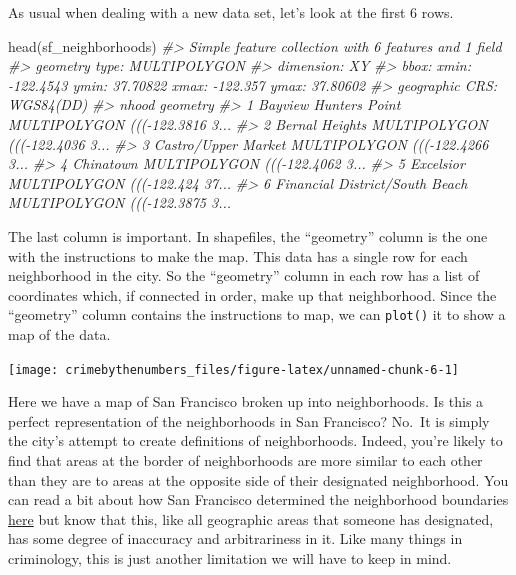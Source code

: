 \documentclass[
  12pt,
]{book}
\newenvironment{Shaded}{\begin{snugshade}}{\end{snugshade}}
\newcommand{\CommentTok}[1]{\textcolor[rgb]{0.37,0.37,0.37}{\textit{#1}}}
\newcommand{\FunctionTok}[1]{\textcolor[rgb]{0,0,0}{#1}}
\newcommand{\NormalTok}[1]{#1}
\newcommand{\SpecialCharTok}[1]{\textcolor[rgb]{0,0,0}{#1}}
\begin{document}
As usual when dealing with a new data set, let's look at the first 6 rows.

\begin{Shaded}
\begin{Highlighting}[]
\FunctionTok{head}\NormalTok{(sf\_neighborhoods)}
\CommentTok{\#\textgreater{} Simple feature collection with 6 features and 1 field}
\CommentTok{\#\textgreater{} geometry type:  MULTIPOLYGON}
\CommentTok{\#\textgreater{} dimension:      XY}
\CommentTok{\#\textgreater{} bbox:           xmin: {-}122.4543 ymin: 37.70822 xmax: {-}122.357 ymax: 37.80602}
\CommentTok{\#\textgreater{} geographic CRS: WGS84(DD)}
\CommentTok{\#\textgreater{}                            nhood                       geometry}
\CommentTok{\#\textgreater{} 1          Bayview Hunters Point MULTIPOLYGON ((({-}122.3816 3...}
\CommentTok{\#\textgreater{} 2                 Bernal Heights MULTIPOLYGON ((({-}122.4036 3...}
\CommentTok{\#\textgreater{} 3            Castro/Upper Market MULTIPOLYGON ((({-}122.4266 3...}
\CommentTok{\#\textgreater{} 4                      Chinatown MULTIPOLYGON ((({-}122.4062 3...}
\CommentTok{\#\textgreater{} 5                      Excelsior MULTIPOLYGON ((({-}122.424 37...}
\CommentTok{\#\textgreater{} 6 Financial District/South Beach MULTIPOLYGON ((({-}122.3875 3...}
\end{Highlighting}
\end{Shaded}

The last column is important. In shapefiles, the ``geometry'' column is the one with the instructions to make the map. This data has a single row for each neighborhood in the city. So the ``geometry'' column in each row has a list of coordinates which, if connected in order, make up that neighborhood. Since the ``geometry'' column contains the instructions to map, we can \texttt{plot()} it to show a map of the data.

\begin{Shaded}
\end{Shaded}

\begin{center}\texttt{[image: crimebythenumbers\_files/figure-latex/unnamed-chunk-6-1]} \end{center}

Here we have a map of San Francisco broken up into neighborhoods. Is this a perfect representation of the neighborhoods in San Francisco? No.~It is simply the city's attempt to create definitions of neighborhoods. Indeed, you're likely to find that areas at the border of neighborhoods are more similar to each other than they are to areas at the opposite side of their designated neighborhood. You can read a bit about how San Francisco determined the neighborhood boundaries \href{https://data.sfgov.org/Geographic-Locations-and-Boundaries/Analysis-Neighborhoods/p5b7-5n3h}{here} but know that this, like all geographic areas that someone has designated, has some degree of inaccuracy and arbitrariness in it. Like many things in criminology, this is just another limitation we will have to keep in mind.
\end{document}

